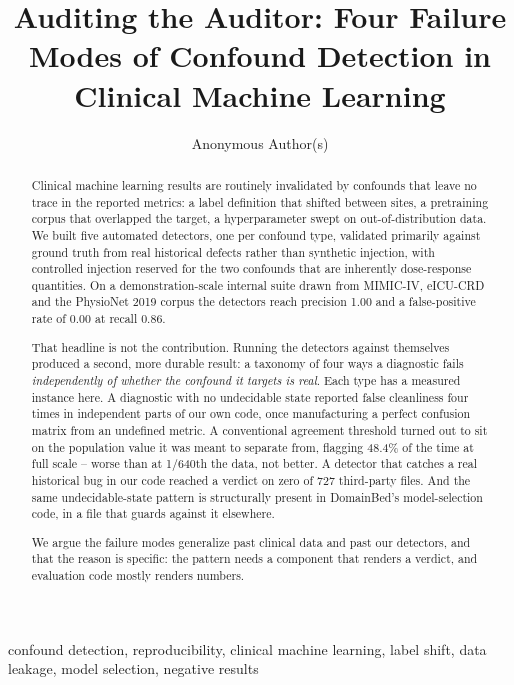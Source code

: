 \documentclass[pmlr,twocolumn,10pt]{jmlr}
\title[Auditing the Auditor]{Auditing the Auditor: Four Failure Modes of
Confound Detection in Clinical Machine Learning}
\author{Anonymous Author(s)}
\begin{document}
\maketitle

\ifmlhdemo\else
\begin{abstract}
Clinical machine learning results are routinely invalidated by confounds that
leave no trace in the reported metrics: a label definition that shifted between
sites, a pretraining corpus that overlapped the target, a hyperparameter swept
on out-of-distribution data. We built five automated detectors, one per confound
type, validated primarily against ground truth from real historical defects
rather than synthetic injection, with controlled injection reserved for the two
confounds that are inherently dose-response quantities. On a
demonstration-scale internal suite drawn from MIMIC-IV, eICU-CRD and the
PhysioNet 2019 corpus the detectors reach precision 1.00 and a false-positive
rate of 0.00 at recall 0.86.

That headline is not the contribution. Running the detectors against themselves
produced a second, more durable result: a taxonomy of four ways a diagnostic
fails \emph{independently of whether the confound it targets is real}. Each type
has a measured instance here. A diagnostic with no undecidable state reported
false cleanliness four times in independent parts of our own code, once
manufacturing a perfect confusion matrix from an undefined metric. A
conventional agreement threshold turned out to sit on the population value it
was meant to separate from, flagging 48.4\% of the time at full scale -- worse
than at 1/640th the data, not better. A detector that catches a real historical
bug in our code reached a verdict on zero of 727 third-party files. And the same
undecidable-state pattern is structurally present in DomainBed's model-selection
code, in a file that guards against it elsewhere.

We argue the failure modes generalize past clinical data and past our detectors,
and that the reason is specific: the pattern needs a component that renders a
verdict, and evaluation code mostly renders numbers.
\end{abstract}
\begin{keywords}
confound detection, reproducibility, clinical machine learning, label shift,
data leakage, model selection, negative results
\end{keywords}
\fi

\ifmlhneedsstatements
\end{document}
